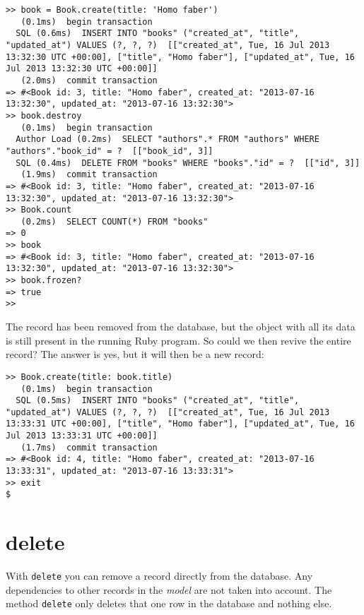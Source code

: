 \documentclass[a4paper]{book}
\newcounter{tab}[chapter]
\begin{document}
\begin{shaded}\begin{verbatim}
>> book = Book.create(title: 'Homo faber')
   (0.1ms)  begin transaction
  SQL (0.6ms)  INSERT INTO "books" ("created_at", "title", "updated_at") VALUES (?, ?, ?)  [["created_at", Tue, 16 Jul 2013 13:32:30 UTC +00:00], ["title", "Homo faber"], ["updated_at", Tue, 16 Jul 2013 13:32:30 UTC +00:00]]
   (2.0ms)  commit transaction
=> #<Book id: 3, title: "Homo faber", created_at: "2013-07-16 13:32:30", updated_at: "2013-07-16 13:32:30">
>> book.destroy
   (0.1ms)  begin transaction
  Author Load (0.2ms)  SELECT "authors".* FROM "authors" WHERE "authors"."book_id" = ?  [["book_id", 3]]
  SQL (0.4ms)  DELETE FROM "books" WHERE "books"."id" = ?  [["id", 3]]
   (1.9ms)  commit transaction
=> #<Book id: 3, title: "Homo faber", created_at: "2013-07-16 13:32:30", updated_at: "2013-07-16 13:32:30">
>> Book.count
   (0.2ms)  SELECT COUNT(*) FROM "books"
=> 0
>> book
=> #<Book id: 3, title: "Homo faber", created_at: "2013-07-16 13:32:30", updated_at: "2013-07-16 13:32:30">
>> book.frozen?
=> true
>>
\end{verbatim}\end{shaded}

The record has been removed from the database, but the object with all its data is still present in the running Ruby program. So could we then revive the entire record? The answer is yes, but it will then be a new record:

\begin{shaded}\begin{verbatim}
>> Book.create(title: book.title)
   (0.1ms)  begin transaction
  SQL (0.5ms)  INSERT INTO "books" ("created_at", "title", "updated_at") VALUES (?, ?, ?)  [["created_at", Tue, 16 Jul 2013 13:33:31 UTC +00:00], ["title", "Homo faber"], ["updated_at", Tue, 16 Jul 2013 13:33:31 UTC +00:00]]
   (1.7ms)  commit transaction
=> #<Book id: 4, title: "Homo faber", created_at: "2013-07-16 13:33:31", updated_at: "2013-07-16 13:33:31">
>> exit
$
\end{verbatim}\end{shaded}

\section{delete}\label{delete}

With \texttt{delete} you can remove a record directly from the database. Any dependencies to other records in the \emph{model} are not taken into account. The method \texttt{delete} only deletes that one row in the database and nothing else.
\end{document}
